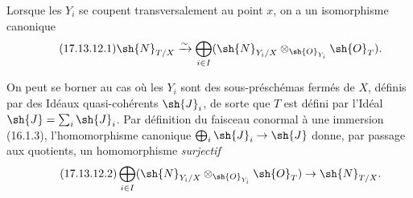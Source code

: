 \begin{corollary}[17.13.12]
\label{IV.17.13.12}
Lorsque les $Y_i$ se coupent transversalement au point $x$, on a un isomorphisme canonique
\[
\label{IV.17.13.12.1}
\tag{17.13.12.1}
\sh{N}_{T/X}\xrightarrow{\sim}\bigoplus_{i\in I}(\sh{N}_{Y_i/X}\otimes_{\sh{O}_{Y_i}}\sh{O}_T).
\]
\end{corollary}

On peut se borner au cas où les $Y_i$ sont des sous-préschémas fermés de $X$, définis par des Idéaux quasi-cohérents $\sh{J}_i$, de sorte que $T$ est défini par l'Idéal $\sh{J}=\sum_i\sh{J}_i$. Par définition du faisceau conormal à une immersion (16.1.3), l'homomorphisme canonique $\bigoplus_i\sh{J}_i\to\sh{J}$ donne, par passage aux quotients, un homomorphisme \emph{surjectif}
\[
\label{IV.17.13.12.2}
\tag{17.13.12.2}
\bigoplus_{i\in I}(\sh{N}_{Y_i/X}\otimes_{\sh{O}_{Y_i}}\sh{O}_T)\to\sh{N}_{T/X}.
\]

